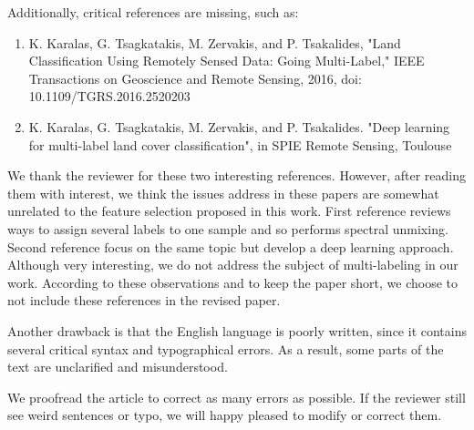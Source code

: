 \documentclass[a4paper,10pt,DIV=16]{scrartcl}
\begin{document}
\begin{revbox}
  Additionally, critical references are missing, such as:
  \begin{enumerate}
  \item K. Karalas, G. Tsagkatakis, M. Zervakis, and P. Tsakalides, "Land Classification Using Remotely Sensed Data: Going Multi-Label," IEEE Transactions on Geoscience and Remote Sensing, 2016, doi: 10.1109/TGRS.2016.2520203
  \item K. Karalas, G. Tsagkatakis, M. Zervakis, and P. Tsakalides. "Deep learning for multi-label land cover classification", in SPIE Remote Sensing, Toulouse
  \end{enumerate}

  \begin{resbox}
    We thank the reviewer for these two interesting references. However, after reading them with interest, we think the issues address in these papers are somewhat unrelated to the feature selection proposed in this work.  First reference reviews ways to assign several labels to one sample and so performs spectral unmixing. Second reference focus on the same topic but develop a deep learning approach. Although very interesting, we do not address the subject of multi-labeling in our work.  According to these observations and to keep the paper short, we choose to not include these references in the revised paper.
  \end{resbox}
\end{revbox}

\begin{revbox}
  Another drawback is that the English language is poorly written, since it contains several critical syntax and typographical errors. As a result, some parts of the text are unclarified and misunderstood.
  \begin{resbox}
    We proofread the article to correct as many errors as possible. If the reviewer still see weird sentences or typo, we will happy pleased to modify or correct them.

  \end{resbox}
\end{revbox}
\end{document}
